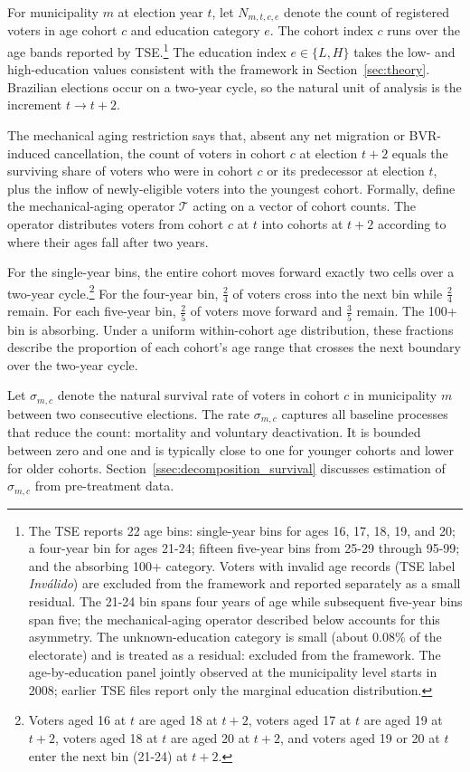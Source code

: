 For municipality $m$ at election year $t$, let $N_{m,t,c,e}$ denote the count of registered voters in age cohort $c$ and education category $e$. The cohort index $c$ runs over the age bands reported by TSE.\footnote{The TSE reports 22 age bins: single-year bins for ages 16, 17, 18, 19, and 20; a four-year bin for ages 21-24; fifteen five-year bins from 25-29 through 95-99; and the absorbing 100+ category. Voters with invalid age records (TSE label \emph{Inv\'alido}) are excluded from the framework and reported separately as a small residual. The 21-24 bin spans four years of age while subsequent five-year bins span five; the mechanical-aging operator described below accounts for this asymmetry. The unknown-education category is small (about 0.08\% of the electorate) and is treated as a residual: excluded from the framework. The age-by-education panel jointly observed at the municipality level starts in 2008; earlier TSE files report only the marginal education distribution.} The education index $e \in \{L, H\}$ takes the low- and high-education values consistent with the framework in Section~\ref{sec:theory}. Brazilian elections occur on a two-year cycle, so the natural unit of analysis is the increment $t \to t+2$.

The mechanical aging restriction says that, absent any net migration or BVR-induced cancellation, the count of voters in cohort $c$ at election $t+2$ equals the surviving share of voters who were in cohort $c$ or its predecessor at election $t$, plus the inflow of newly-eligible voters into the youngest cohort. Formally, define the mechanical-aging operator $\mathcal{T}$ acting on a vector of cohort counts. The operator distributes voters from cohort $c$ at $t$ into cohorts at $t+2$ according to where their ages fall after two years.

For the single-year bins, the entire cohort moves forward exactly two cells over a two-year cycle.\footnote{Voters aged 16 at $t$ are aged 18 at $t+2$, voters aged 17 at $t$ are aged 19 at $t+2$, voters aged 18 at $t$ are aged 20 at $t+2$, and voters aged 19 or 20 at $t$ enter the next bin (21-24) at $t+2$.} For the four-year bin, $\tfrac{2}{4}$ of voters cross into the next bin while $\tfrac{2}{4}$ remain. For each five-year bin, $\tfrac{2}{5}$ of voters move forward and $\tfrac{3}{5}$ remain. The 100+ bin is absorbing. Under a uniform within-cohort age distribution, these fractions describe the proportion of each cohort's age range that crosses the next boundary over the two-year cycle.

Let $\sigma_{m,c}$ denote the natural survival rate of voters in cohort $c$ in municipality $m$ between two consecutive elections. The rate $\sigma_{m,c}$ captures all baseline processes that reduce the count: mortality and voluntary deactivation. It is bounded between zero and one and is typically close to one for younger cohorts and lower for older cohorts. Section~\ref{ssec:decomposition_survival} discusses estimation of $\sigma_{m,c}$ from pre-treatment data.

